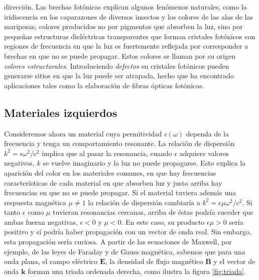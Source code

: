 \documentclass[12pt]{article}
\begin{document}
dirección. Las brechas fotónicas explican algunos fenómenos naturales,
como la iridiscencia en los caparazones de diversos insectos y los
colores de las alas de las mariposas, colores producidos no por
pigmentos que absorben la luz, sino por pequeñas estructuras
dieléctricas transparentes que forman cristales fotónicos con regiones
de frecuencia en que la luz es fuertemente reflejada por corresponder
a brechas en que no se puede propagar. Estos colores se llaman por su
origen {\em colores estructurales}. Introduciendo {\em defectos} en
cristales fotónicos pueden generarse sitios en que la luz puede ser
atrapada, hecho que ha encontrado aplicaciones tales como la
elaboración de fibras ópticas fotónicas.

\subsection{Materiales izquierdos}
Consideremos ahora un material cuya permitividad $\epsilon(\omega)$
dependa de la frecuencia y tenga un comportamiento resonante. La
relación de dispersión $k^2=\epsilon\omega^2/c^2$ implica que al pasar
la resonancia, cuando $\epsilon$ adquiere valores negativos, $k$ se
vuelve imaginario y la luz no puede propagarse. Esto explica la
aparición del color en los materiales comunes, en que hay frecuencias
características de cada material en que absorben luz y justo arriba
hay frecuencias en que no se puede propagar. Si el material tuviera
además una respuesta magnética $\mu\ne 1$ la relación de dispersión
cambiaría a $k^2=\epsilon\mu\omega^2/c^2$. Si tanto $\epsilon$ como
$\mu$ tuvieran resonancias cercanas, arriba de éstas podría suceder
que ambas fueran negativas, $\epsilon<0$ y $\mu<0$. En este caso, su
producto $\epsilon\mu>0$ sería positivo y sí podría haber propagación
con un vector de onda real. Sin embargo, esta propagación sería
curiosa. A partir de las ecuaciones de Maxwell, por ejemplo,
de las leyes de Faraday y de Gauss magnética, sabemos que para una onda plana,
el campo eléctrico $\bm E$, la densidad de flujo magnético $\bm B$ y
el vector de onda $\bm k$ forman una triada ordenada derecha, como
ilustra la figura \ref{fig:triada}.
\end{document}
